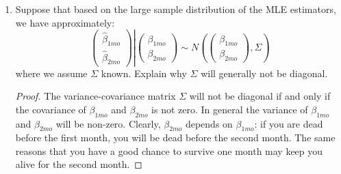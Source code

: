 \documentclass[letterpaper, 12pt]{article}
\begin{document}
\begin{enumerate}
\begin{proof}
We have 
\begin{equation}
f(\hat{\beta}_{h1}, \hat{\beta}_{h2}) = \varphi_{\beta, V_{h1}}(\hat{\beta}_{h1}) \varphi_{\beta, V_{h2}}(\hat{\beta}_{h2})
=
\frac{1}{\sqrt{2\pi V_{h1}}} \exp\left\{\frac{-(\hat{\beta}_{h1} -\beta)^2}{2V_{h1}}\right\}
\frac{1}{\sqrt{2\pi V_{h2}}} \exp\left\{\frac{-(\hat{\beta}_{h2} -\beta)^2}{2V_{h2}}\right\}
\end{equation}
Taking the logarithm, we get
\begin{equation}
\ell = \log(f) = \frac{-1}{2}\log(2\pi V_{h1}) - \frac{(\hat{\beta}_{h1} -\beta)^2}{2V_{h1}}
-\frac{1}{2} \log(2\pi V_{h2}) - \frac{(\hat{\beta}_{h2} -\beta)^2}{2V_{h2}}
\end{equation}
Taking the derivative with respect to $\beta$, we get
\begin{equation}
\frac{d\ell}{d\beta} = \frac{\hat{\beta}_{h1} -\beta}{V_{h1}} + \frac{\hat{\beta}_{h2} -\beta}{V_{h2}}
\end{equation}
Setting that to $0$ and solving for $\beta$, we get
\begin{equation}
\beta = \frac{V_{h2}\hat{\beta}_{h1}+V_{h1}\hat{\beta}_{h2}}{V_{h1} + V_{h2}}
\end{equation}
\end{proof}
\item
Suppose that based on the large sample distribution of the MLE estimators, we have approximately:
\begin{equation}
\label{2mo}
\left.
\begin{pmatrix}
\hat{\beta}_{1mo} \\
\hat{\beta}_{2mo}
\end{pmatrix}
\right|
\begin{pmatrix}
\beta_{1mo} \\
\beta_{2mo}
\end{pmatrix}
\sim
N
\left(
\begin{pmatrix}
\beta_{1mo} \\
\beta_{2mo}
\end{pmatrix} , 
\Sigma
\right)
\end{equation}
where we assume $\Sigma$ known. Explain why $\Sigma$ will generally not be diagonal.
\begin{proof}
The variance-covariance matrix $\Sigma$ will not be diagonal if and only if the covariance of $\beta_{1mo}$ and $\beta_{2mo}$ is not zero.
In general the variance of $\beta_{1mo}$ and $\beta_{2mo}$ will be non-zero. Clearly, $\beta_{2mo}$ depends on $\beta_{1mo}$: if you are dead before the first month, you will be dead before the second month. The same reasons that you have a good chance to survive one month may keep you alive for the second month.
\end{proof}


\end{enumerate}
\end{document}
